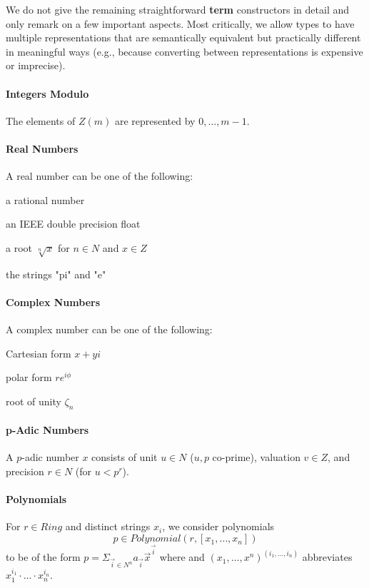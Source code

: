 We do not give the remaining straightforward \textbf{term} constructors in detail and only remark on a few important aspects.
Most critically, we allow types to have multiple representations that are semantically equivalent but practically different in meaningful ways (e.g., because converting between representations is expensive or imprecise).

\paragraph{Integers Modulo}
The elements of $Z(m)$ are represented by $0,\ldots,m-1$.

\paragraph{Real Numbers}
A real number can be one of the following:
\begin{compactitem}
 \item a rational number
 \item an IEEE double precision float
 \item a root $\sqrt[n]{x}$ for $n\in N$ and $x\in Z$
 \item the strings "pi" and "e"
\end{compactitem}

\paragraph{Complex Numbers}
A complex number can be one of the following:
\begin{compactitem}
 \item Cartesian form $x+yi$
 \item polar form $r e^{i\phi}$
 \item root of unity $\zeta_n$
\end{compactitem}

\paragraph{p-Adic Numbers}
A $p$-adic number $x$ consists of unit $u\in N$ ($u,p$ co-prime), valuation $v\in Z$, and precision $r\in N$ (for $u<p^r$).

\paragraph{Polynomials}
For $r\in Ring$ and distinct strings $x_i$, we consider polynomials
\[p\in Polynomial(r,[x_1,\ldots,x_n])\]
to be of the form $p=\Sigma_{\vec{i}\in N^n} a_{\vec{i}} \vec{x}^{\vec{i}}$ where and $(x_1,\ldots,x^n)^{(i_1,\ldots,i_n)}$ abbreviates $x_1^{i_1}\cdot \ldots\cdot x_n^{i_n}$.

